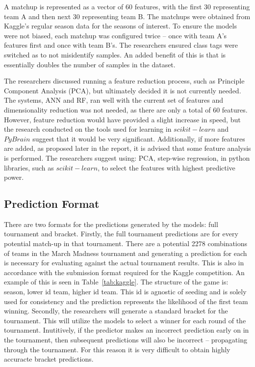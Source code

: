 \documentclass[conference]{IEEEtran}
\begin{document}
{A matchup is represented as a vector of 60 features, with the first 30 representing team A and then next 30 representing team B. The matchups were obtained from Kaggle's regular season data for the seasons of interest.
To ensure the models were not biased, each matchup was configured twice -- once with team A's features first and once with team B's. The researchers ensured class tags were switched as to not misidentify samples.
An added benefit of this is that is essentially doubles the number of samples in the dataset.

The researchers discussed running a feature reduction process, such as Principle Component Analysis (PCA), but ultimately decided it is not currently needed. 
The systems, ANN and RF, ran well with the current set of features and dimensionality reduction was not needed, as there are only a total of 60 features.
However, feature reduction would have provided a slight increase in speed, but the research conducted on the tools used for learning in $scikit-learn$ and $PyBrain$ suggest that it would be very significant.
Additionally, if more features are added, as proposed later in the report, it is advised that some feature analysis is performed.
The researchers suggest using: PCA, step-wise regression, in python libraries, such as $scikit-learn$, to select the features with highest predictive power.

\subsection{Prediction Format}
There are two formats for the predictions generated by the models: full tournament and bracket. Firstly, the full tournament predictions are for every potential match-up in that tournament. 
There are a potential 2278 combinations of teams in the March Madness tournament and generating a prediction for each is necessary for evaluating against the actual tournament results. This is also in accordance with the submission format required for the Kaggle competition.
An example of this is seen in Table~\ref{tab:kaggle}. 
The structure of the game is: season, lower id team, higher id team.
This id is agnostic of seeding and is solely used for consistency and the prediction represents the likelihood of the first team winning.
Secondly, the researchers will generate a standard bracket for the tournament. 
This will utilize the models to select a winner for each round of the tournament. 
Inutitively, if the predictor makes an incorrect prediction early on in the tournament, then subsequent predictions will also be incorrect -- propagating through the tournament.
For this reason it is very difficult to obtain highly accuracte bracket predictions.

}
\end{document}
